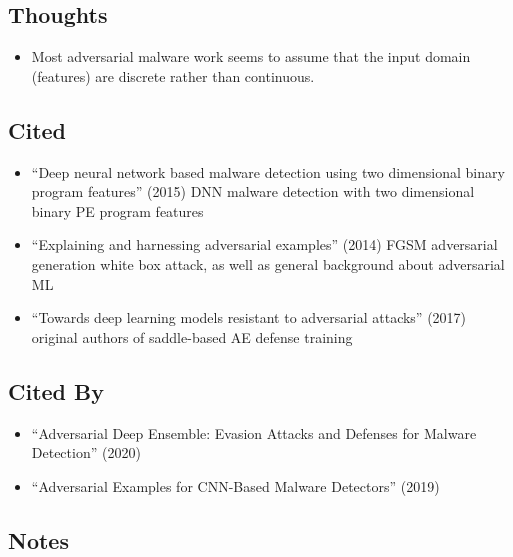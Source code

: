 \documentclass{article}
\begin{document}
\subsection*{Thoughts}
\begin{itemize}
\item Most adversarial malware work seems to assume that the input domain (features) are discrete rather than continuous.
\end{itemize}

\subsection*{Cited}
\begin{itemize}
\item ``Deep neural network based malware detection using two dimensional binary program features'' (2015) DNN malware detection with two dimensional binary PE program features
\item ``Explaining and harnessing adversarial examples'' (2014) FGSM adversarial generation white box attack, as well as general background about adversarial ML
\item ``Towards deep learning models resistant to adversarial attacks'' (2017) original authors of saddle-based AE defense training
\end{itemize}

\subsection*{Cited By}
\begin{itemize}
\item ``Adversarial Deep Ensemble: Evasion Attacks and Defenses for Malware Detection'' (2020)
\item ``Adversarial Examples for CNN-Based Malware Detectors'' (2019)
\end{itemize}

\subsection*{Notes}
\end{document}
